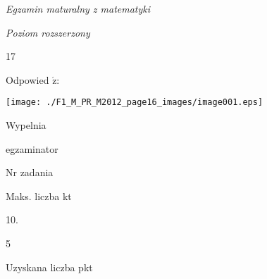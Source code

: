 \documentclass[a4paper,12pt]{article}
\begin{document}
{\it Egzamin maturalny z matematyki}

{\it Poziom rozszerzony}

17

Odpowied $\acute{\mathrm{z}}$:
\begin{center}
\texttt{[image: ./F1\_M\_PR\_M2012\_page16\_images/image001.eps]}
\end{center}
Wypelnia

egzaminator

Nr zadania

Maks. liczba kt

10.

5

Uzyskana liczba pkt
\end{document}
